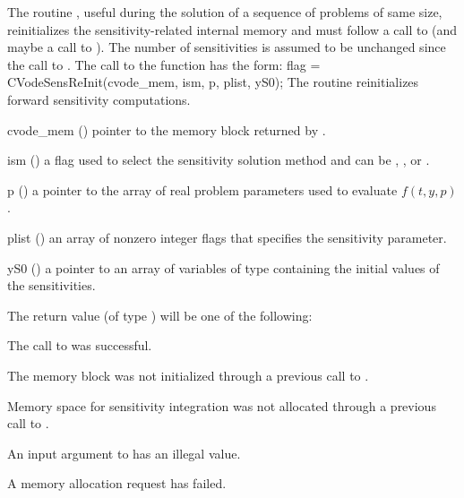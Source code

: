 The routine , useful during the solution of a sequence of problems of 
same size, reinitializes the sensitivity-related internal memory 
and must follow a call to  (and maybe a call to ). 
The number  of sensitivities is assumed to be unchanged since the call to 
.
The call to the  function has the form:
{
  flag = CVodeSensReInit(cvode\_mem, ism, p, plist, yS0);
}
{
  The routine  reinitializes forward sensitivity computations.
}
{
  \begin{args}

  \item[cvode\_mem] ()
    pointer to the {\cvodes} memory block returned by .

  \item[ism] ()
    a flag used to select the sensitivity solution method and can 
    be , , or .

  \item[p] ()
    a pointer to the array of real problem parameters used to evaluate $f(t,y,p)$.
    
  \item[plist] () 
    an array of  nonzero integer flags that specifies the sensitivity parameter.
    
  \item[yS0] () 
    a pointer to an array of  variables of type  containing the 
    initial values of the sensitivities.

  \end{args}
}
{
  The return value  (of type ) will be one of the following:
  \begin{args}
  \item[\Id{CV\_SUCCESS}]
    The call to  was successful.
  \item[\Id{CV\_MEM\_NULL}] 
    The {\cvodes} memory block was not initialized through a 
    previous call to .
  \item[\Id{CV\_NO\_SENSI}]
    Memory space for sensitivity integration was not allocated through a 
    previous call to .
  \item[\Id{CV\_ILL\_INPUT}] 
    An input argument to  has an illegal value.    
  \item[\Id{CV\_MEM\_FAIL}] 
    A memory allocation request has failed.
  \end{args}
}
